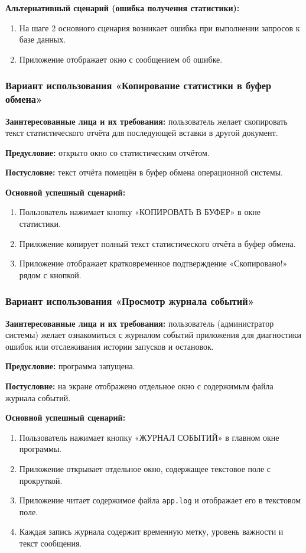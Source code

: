 \textbf{Альтернативный сценарий (ошибка получения статистики):}
\begin{enumerate}
	\item На шаге 2 основного сценария возникает ошибка при выполнении запросов к базе данных.
	\item Приложение отображает окно с сообщением об ошибке.
\end{enumerate}

\subsubsection{Вариант использования «Копирование статистики в буфер обмена»}

\textbf{Заинтересованные лица и их требования:} пользователь желает скопировать текст статистического отчёта для последующей вставки в другой документ.

\textbf{Предусловие:} открыто окно со статистическим отчётом.

\textbf{Постусловие:} текст отчёта помещён в буфер обмена операционной системы.

\textbf{Основной успешный сценарий:}
\begin{enumerate}
	\item Пользователь нажимает кнопку «КОПИРОВАТЬ В БУФЕР» в окне статистики.
	\item Приложение копирует полный текст статистического отчёта в буфер обмена.
	\item Приложение отображает кратковременное подтверждение «Скопировано!» рядом с кнопкой.
\end{enumerate}

\subsubsection{Вариант использования «Просмотр журнала событий»}

\textbf{Заинтересованные лица и их требования:} пользователь (администратор системы) желает ознакомиться с журналом событий приложения для диагностики ошибок или отслеживания истории запусков и остановок.

\textbf{Предусловие:} программа запущена.

\textbf{Постусловие:} на экране отображено отдельное окно с содержимым файла журнала событий.

\textbf{Основной успешный сценарий:}
\begin{enumerate}
	\item Пользователь нажимает кнопку «ЖУРНАЛ СОБЫТИЙ» в главном окне программы.
	\item Приложение открывает отдельное окно, содержащее текстовое поле с прокруткой.
	\item Приложение читает содержимое файла \texttt{app.log} и отображает его в текстовом поле.
	\item Каждая запись журнала содержит временную метку, уровень важности и текст сообщения.
\end{enumerate}

